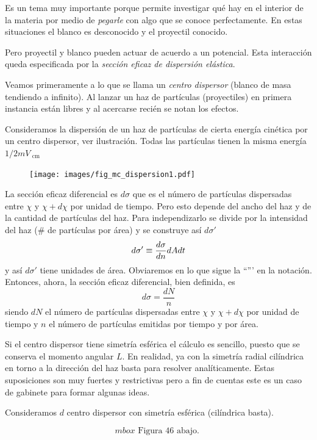\documentclass[10pt,oneside]{CBFT_book}
\begin{document}
Es un tema muy importante porque permite investigar qué hay en el interior de la materia por medio
de {\it pegarle} con algo que se conoce perfectamente.
En estas situaciones el blanco es desconocido y el proyectil conocido.

Pero proyectil y blanco pueden actuar de acuerdo a un potencial. Esta interacción queda especificada
por la {\it sección eficaz de dispersión elástica}.

Veamos primeramente a lo que se llama un {\it centro dispersor} (blanco de masa tendiendo a infinito).
Al lanzar un haz de partículas (proyectiles) en primera instancia están libres y al acercarse recién se
notan los efectos.

Consideramos la dispersión de un haz de partículas de cierta energía cinética por un centro dispersor,
ver ilustración. Todas las partículas tienen la misma energía $1/2 m V_\text{ cm }$

\begin{figure}[htb]
	\begin{center}
	\texttt{[image: images/fig\_mc\_dispersion1.pdf]}	 
	\end{center}
	\caption{}
\end{figure} 


La sección eficaz diferencial es $d\sigma$ que es el número de partículas dispersadas entre 
$\chi$ y $\chi + d\chi$ por unidad de tiempo.
Pero esto depende del ancho del haz y de la cantidad de partículas del haz. Para independizarlo se
divide por la intensidad del haz (\# de partículas por área) y se construye así $d\sigma'$
\[
	d\sigma' \equiv \frac{d^{\hspace{-0.05em}} {\sigma}}{d {n}^{\hspace{-0.05em}}} dA dt 
\]
y así $d\sigma'$ tiene unidades de área. Obviaremos en lo que sigue la ``''' en la notación.
Entonces, ahora, la sección eficaz diferencial, bien definida, es 
\[
	d\sigma = \frac{dN}{n}
\]
siendo $dN$ el número de partículas dispersadas entre $\chi$ y $\chi + d\chi$ por unidad de tiempo
y $n$ el número de partículas emitidas por tiempo y por área.

Si el centro dispersor tiene simetría esférica el cálculo es sencillo, puesto que se conserva el 
momento angular $L$. En realidad, ya con la simetría radial cilíndrica en torno a la dirección del 
haz basta para resolver analíticamente.
Estas suposiciones son muy fuertes y restrictivas pero a fin de cuentas este es un caso de gabinete
para formar algunas ideas.

Consideramos $d$ centro dispersor con simetría esférica (cilíndrica basta).

\[
	mbox{ \text{ Figura 46 abajo. } }
\]
\end{document}
